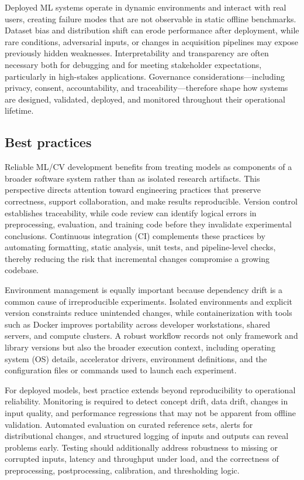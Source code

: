 \documentclass{article}
\begin{document}
Deployed ML systems operate in dynamic environments and interact with real users, creating failure modes that are not observable in static offline benchmarks. Dataset bias and distribution shift can erode performance after deployment, while rare conditions, adversarial inputs, or changes in acquisition pipelines may expose previously hidden weaknesses. Interpretability and transparency are often necessary both for debugging and for meeting stakeholder expectations, particularly in high-stakes applications. Governance considerations---including privacy, consent, accountability, and traceability---therefore shape how systems are designed, validated, deployed, and monitored throughout their operational lifetime.


\subsection{Best practices}

Reliable ML/CV development benefits from treating models as components of a broader software system rather than as isolated research artifacts. This perspective directs attention toward engineering practices that preserve correctness, support collaboration, and make results reproducible. Version control establishes traceability, while code review can identify logical errors in preprocessing, evaluation, and training code before they invalidate experimental conclusions. Continuous integration (CI) complements these practices by automating formatting, static analysis, unit tests, and pipeline-level checks, thereby reducing the risk that incremental changes compromise a growing codebase.

Environment management is equally important because dependency drift is a common cause of irreproducible experiments. Isolated environments and explicit version constraints reduce unintended changes, while containerization with tools such as Docker improves portability across developer workstations, shared servers, and compute clusters. A robust workflow records not only framework and library versions but also the broader execution context, including operating system (OS) details, accelerator drivers, environment definitions, and the configuration files or commands used to launch each experiment.

For deployed models, best practice extends beyond reproducibility to operational reliability. Monitoring is required to detect concept drift, data drift, changes in input quality, and performance regressions that may not be apparent from offline validation. Automated evaluation on curated reference sets, alerts for distributional changes, and structured logging of inputs and outputs can reveal problems early. Testing should additionally address robustness to missing or corrupted inputs, latency and throughput under load, and the correctness of preprocessing, postprocessing, calibration, and thresholding logic.
\end{document}
